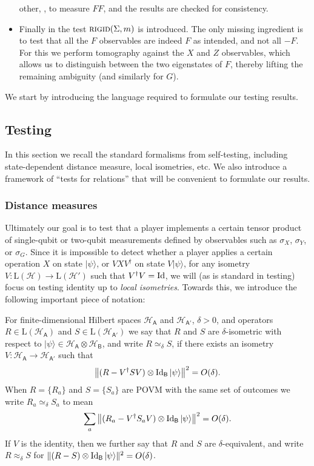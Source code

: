 \documentclass{toc}
\newcommand{\ket}[1]{|#1\rangle}
\newcommand{\Id}{\ensuremath{\mathop{\rm Id}\nolimits}}
\newcommand{\setft}[1]{\mathrm{#1}}
\newcommand{\Lin}{\setft{L}}
\newcommand{\reg}[1]{{\textsf{#1}}}
\newcommand{\mH}{\mathcal{H}}
\newcommand{\rigid}{\textsc{rigid}}
\begin{document}
\begin{itemize}
other, \eg, to  %
measure $FF$, and the results are checked for consistency. 
\item Finally in  the test $\rigid(\Sigma,m)$ is introduced. The only missing ingredient is to test that all the $F$ observables are indeed $F$ as intended, and not all $-F$. For this we perform tomography against the $X$ and $Z$ observables, which allows us to distinguish between the two eigenstates of $F$, thereby lifting the remaining ambiguity (and similarly for $G$).
\end{itemize}

We start by introducing the language required to formulate our testing results. 



\subsection{Testing}
\label{sec:general-rigidity}
In this section we recall the standard formalisms from self-testing, including state-dependent distance measure, local isometries, etc. We also introduce a framework of ``tests for relations'' that will be convenient to formulate our results. 


\subsubsection{Distance measures}

Ultimately our goal is to test that a player implements a certain tensor product of single-qubit or two-qubit measurements defined by observables such as $\sigma_X$, $\sigma_Y$, or $\sigma_G$. Since it is impossible to detect whether a player applies a certain operation $X$ on state $\ket{\psi}$, or $VXV^\dagger$ on state $V\ket{\psi}$, for any isometry $V:\Lin(\mH)\to\Lin(\mH')$ such that $V^\dagger V = \Id$, we will (as is standard in testing) focus on testing identity up to \emph{local isometries}. Towards this, we introduce the following important piece of notation: 

\begin{definition}
For finite-dimensional Hilbert spaces $\mH_{\reg{A}}$ and $\mH_{\reg{A}'}$, $\delta>0$, and operators $R \in\Lin(\mH_{\reg{A}})$ and $S\in\Lin(\mH_{\reg{A}'})$ we say that $R$ and $S$ are $\delta$-isometric with respect to $\ket{\psi} \in \mH_{\reg{A}} \otimes \mH_{\reg{B}}$, and write $R\simeq_\delta S$, if there exists an isometry $V:\mH_{\reg{A}}\to\mH_{\reg{A}'}$ such that 
$$\big\|( R-V^\dagger SV)\otimes \Id_{\reg{B}} \ket{\psi}\big\|^2=O(\delta).$$
When $R = \{R_a\}$ and $S=\{S_a\}$ are POVM with the same set of outcomes we write $R_a \simeq_\delta S_a$ to mean
$$\sum_a \big\|( R_a-V^\dagger S_a V)\otimes \Id_{\reg{B}} \ket{\psi}\big\|^2=O(\delta).$$
If $V$ is the identity, then we further say that $R$ and $S$ are $\delta$-equivalent, and write $R\approx_\delta S$ for $\| ( R- S) \otimes \Id_{\reg{B}} \ket{\psi}\|^2=O(\delta)$.
\end{definition}
\end{document}
